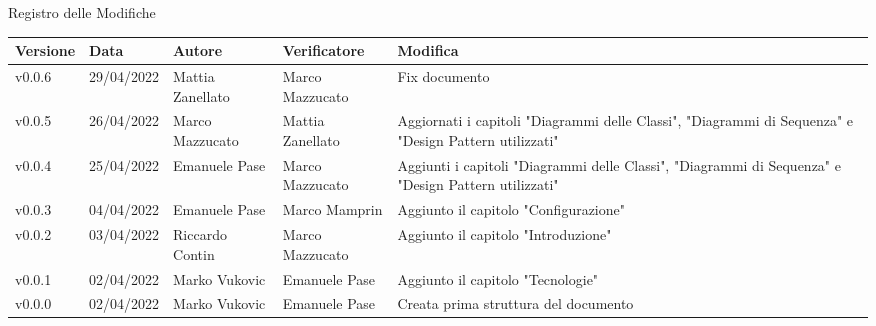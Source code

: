 \begin{center}
  \huge{Registro delle Modifiche}
\end{center}
\renewcommand\arraystretch{1,5}
{\centering
\begin{longtable}{|C{1.8cm}|C{2.1cm}|C{2cm}|C{2.4cm}|L{4.4cm}|}
  \hline
  \textcolor[HTML]{FFFFFF}{\textbf{Versione}} & \textcolor[HTML]{FFFFFF}{\textbf{Data}} & \textcolor[HTML]{FFFFFF}{\textbf{Autore}}  & \textcolor[HTML]{FFFFFF}{\textbf{Verificatore}} & \textcolor[HTML]{FFFFFF}{\textbf{Modifica}}    \\ \hline
  v0.0.6        & 29/04/2022    & Mattia Zanellato   &  Marco Mazzucato & Fix documento \\ \hline
  v0.0.5        & 26/04/2022    & Marco Mazzucato   & Mattia Zanellato   & Aggiornati i capitoli "Diagrammi delle Classi", "Diagrammi di Sequenza" e "Design Pattern utilizzati" \\ \hline
  v0.0.4        & 25/04/2022    & Emanuele Pase   &  Marco Mazzucato       & Aggiunti i capitoli "Diagrammi delle Classi", "Diagrammi di Sequenza" e "Design Pattern utilizzati" \\ \hline
  v0.0.3        & 04/04/2022    & Emanuele Pase   &  Marco Mamprin  & Aggiunto il capitolo "Configurazione" \\ \hline
  v0.0.2        & 03/04/2022    & Riccardo Contin   &   Marco Mazzucato   & Aggiunto il capitolo "Introduzione" \\ \hline
  v0.0.1        & 02/04/2022    & Marko Vukovic   & Emanuele Pase         & Aggiunto il capitolo "Tecnologie" \\ \hline
  v0.0.0        & 02/04/2022    & Marko Vukovic   & Emanuele Pase         & Creata prima struttura del documento \\ \hline
\end{longtable}}

\renewcommand\arraystretch{1}
